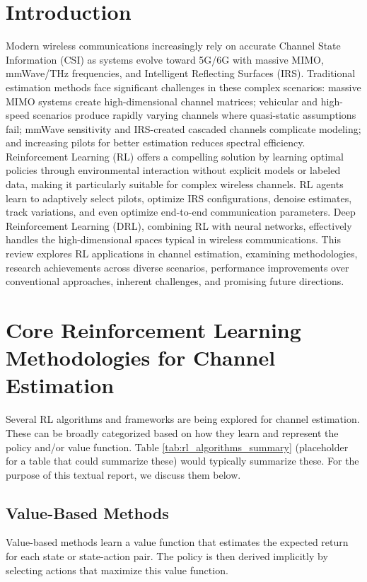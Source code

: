 \documentclass[journal,twocolumn]{IEEEtran}
\begin{document}
\section{Introduction}

Modern wireless communications increasingly rely on accurate Channel State Information (CSI) as systems evolve toward 5G/6G with massive MIMO, mmWave/THz frequencies, and Intelligent Reflecting Surfaces (IRS). Traditional estimation methods face significant challenges in these complex scenarios: massive MIMO systems create high-dimensional channel matrices; vehicular and high-speed scenarios produce rapidly varying channels where quasi-static assumptions fail; mmWave sensitivity and IRS-created cascaded channels complicate modeling; and increasing pilots for better estimation reduces spectral efficiency. Reinforcement Learning (RL) offers a compelling solution by learning optimal policies through environmental interaction without explicit models or labeled data, making it particularly suitable for complex wireless channels. RL agents learn to adaptively select pilots, optimize IRS configurations, denoise estimates, track variations, and even optimize end-to-end communication parameters. Deep Reinforcement Learning (DRL), combining RL with neural networks, effectively handles the high-dimensional spaces typical in wireless communications. This review explores RL applications in channel estimation, examining methodologies, research achievements across diverse scenarios, performance improvements over conventional approaches, inherent challenges, and promising future directions.

\section{Core Reinforcement Learning Methodologies for Channel Estimation}
Several RL algorithms and frameworks are being explored for channel estimation. These can be broadly categorized based on how they learn and represent the policy and/or value function. Table \ref{tab:rl_algorithms_summary} (placeholder for a table that could summarize these) would typically summarize these. For the purpose of this textual report, we discuss them below.

\subsection{Value-Based Methods}
Value-based methods learn a value function that estimates the expected return for each state or state-action pair. The policy is then derived implicitly by selecting actions that maximize this value function.
\end{document}
